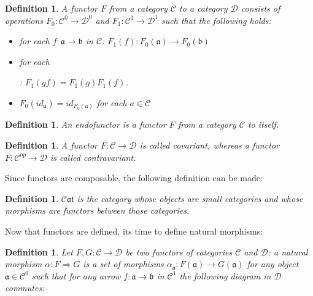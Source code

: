 \documentclass{article}
\newcommand{\cat}[1]{\mathcal{#1}} %
\newcommand{\cato}[1]{\cat{#1}^0} %
\newcommand{\catm}[1]{\cat{#1}^1} %
\newcommand{\ob}[1]{\mathfrak{#1}} %
\newcommand{\scat}{\cat{C}\ob{at}}
\newcommand{\catop}[1]{\cat{#1}^{op}}
\newtheorem{definition}[theorem]{Definition}
\begin{document}
\begin{definition}
	A functor $F$ from a category $\cat{C}$ to a category $\cat{D}$ consists of operations $F_0: \cato{C} \rightarrow \cato{D}$ and $F_1: \catm{C} \rightarrow \catm{D}$ such that the following holds:
	\begin{itemize}
			\item for each $f: \ob{a} \rightarrow \ob{b}$ in $\cat{C}$: $F_1(f): F_0(\ob{a}) \rightarrow F_0(\ob{b})$
			\item for each 
			: $F_1(gf) = F_1(g)F_1(f)$.
			\item $F_0(id_{\ob{a}}) = id_{F_0(\ob{a})}$ for each $a \in \cat{C}$
	\end{itemize}
\end{definition}

\begin{definition}
	An endofunctor is a functor $F$ from a category $\cat{C}$ to itself.
\end{definition}

\begin{definition}
	A functor $F: \cat{C} \rightarrow \cat{D}$ is called \emph{covariant}, whereas a functor $F: \catop{C} \rightarrow \cat{D}$ is called \emph{contravariant}.
\end{definition}

Since functors are composable, the following definition can be made:

\begin{definition}
	$\scat$ is the category whose objects are \emph{small categories} and whose morphisms are functors between those categories.
\end{definition}

Now that functors are defined, its time to define natural morphisms:

\begin{definition}
	Let $F, G: \cat{C} \rightarrow \cat{D}$ be two functors of categories $\cat{C}$ and $\cat{D}$: a \emph{natural morphism} $\alpha: F \Rightarrow G$ is a set of morphisms $\alpha_{\ob{a}}: F(\ob{a}) \rightarrow G(\ob{a})$ for any object $\ob{a} \in \cato{C}$ such that for any arrow $f: \ob{a} \rightarrow \ob{b}$ in $\catm{C}$ the following diagram in $\cat{D}$ commutes:

\end{definition}
\end{document}

